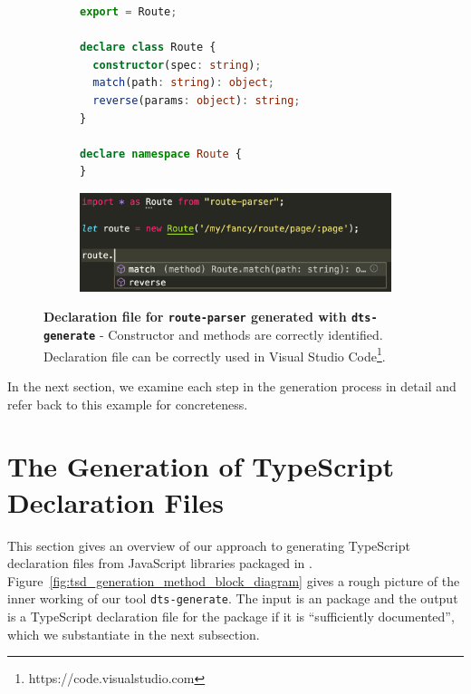 \documentclass[a4paper,english,cleveref, autoref]{lipics-v2019}
\newcommand{\figref}[1]{Figure~\ref{#1}}
\begin{document}
\begin{figure}[tp]
  \centering
  \begin{subfigure}{0.70\linewidth}
    \begin{lstlisting}[language=TypeScript]
export = Route;

declare class Route {
  constructor(spec: string);
  match(path: string): object;
  reverse(params: object): string;
}

declare namespace Route {
}
    \end{lstlisting}
  \end{subfigure}

  \hspace{10.\textwidth}

  \begin{subfigure}{1.\linewidth}
    \centering
    \includegraphics[width=0.7\linewidth]{motivating-example-route-parser-vscode.png}
  \end{subfigure}

  \caption{\textbf{Declaration file for \texttt{route-parser} generated with \texttt{dts-generate}} - Constructor and methods are correctly identified. Declaration file can be correctly used in Visual Studio Code\footnote{https://code.visualstudio.com}.}
  \label{fig:motivating-example-route-parser-vscode}
\end{figure}

In the next section, we examine each step in the generation process in
detail and refer back to this example for concreteness.

\section{The Generation of TypeScript Declaration Files}
\label{sec:gener-typescr-decl}
This section gives an overview of our approach to generating
TypeScript declaration files from JavaScript libraries packaged in
\NPM. \figref{fig:tsd_generation_method_block_diagram} gives a rough
picture of the inner working of our tool \texttt{dts-generate}. The
input is an \NPM{} package and the output is a TypeScript declaration
file for the package if it is ``sufficiently documented'', which we
substantiate in the next subsection.
\end{document}
